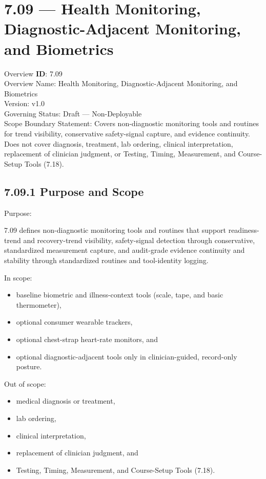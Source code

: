 \documentclass[10pt]{article}
\begin{document}
\section*{7.09 — Health Monitoring, Diagnostic-Adjacent Monitoring, and Biometrics}
{}

Overview \textbf{ID}: 7.09\\
Overview Name: Health Monitoring, Diagnostic-Adjacent Monitoring, and Biometrics\\
Version: v1.0\\
Governing Status: Draft — Non-Deployable\\
Scope Boundary Statement: Covers non-diagnostic monitoring tools and routines for trend visibility, conservative safety-signal capture, and evidence continuity. Does not cover diagnosis, treatment, lab ordering, clinical interpretation, replacement of clinician judgment, or Testing, Timing, Measurement, and Course-Setup Tools (7.18).

\subsection*{7.09.1 Purpose and Scope}
{}

Purpose:

7.09 defines non-diagnostic monitoring tools and routines that support readiness-trend and recovery-trend visibility, safety-signal detection through conservative, standardized measurement capture, and audit-grade evidence continuity and stability through standardized routines and tool-identity logging.

In scope:

\begin{itemize}
\item baseline biometric and illness-context tools (scale, tape, and basic thermometer),
\item optional consumer wearable trackers,
\item optional chest-strap heart-rate monitors, and
\item optional diagnostic-adjacent tools only in clinician-guided, record-only posture.
\end{itemize}

Out of scope:

\begin{itemize}
\item medical diagnosis or treatment,
\item lab ordering,
\item clinical interpretation,
\item replacement of clinician judgment, and
\item Testing, Timing, Measurement, and Course-Setup Tools (7.18).
\end{itemize}
\end{document}
